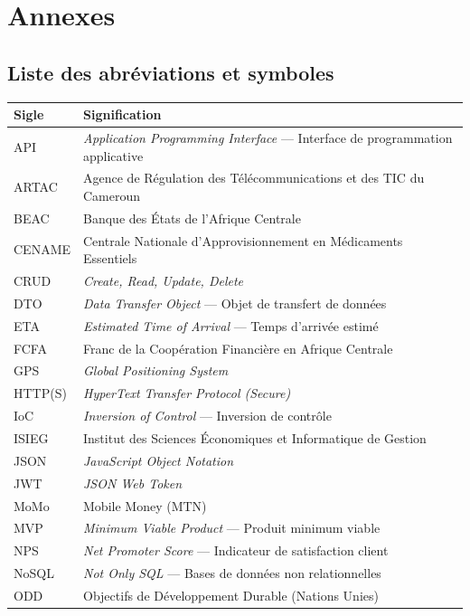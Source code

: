 \documentclass[12pt,a4paper,oneside]{report}
\begin{document}
\chapter*{Annexes}

\section*{Liste des abréviations et symboles}

\begin{longtable}{lp{12cm}}
  \toprule
  \textbf{Sigle} & \textbf{Signification} \\
  \midrule
  API & \textit{Application Programming Interface} — Interface de programmation applicative \\
  ARTAC & Agence de Régulation des Télécommunications et des TIC du Cameroun \\
  BEAC & Banque des États de l'Afrique Centrale \\
  CENAME & Centrale Nationale d'Approvisionnement en Médicaments Essentiels \\
  CRUD & \textit{Create, Read, Update, Delete} \\
  DTO & \textit{Data Transfer Object} — Objet de transfert de données \\
  ETA & \textit{Estimated Time of Arrival} — Temps d'arrivée estimé \\
  FCFA & Franc de la Coopération Financière en Afrique Centrale \\
  GPS & \textit{Global Positioning System} \\
  HTTP(S) & \textit{HyperText Transfer Protocol (Secure)} \\
  IoC & \textit{Inversion of Control} — Inversion de contrôle \\
  ISIEG & Institut des Sciences Économiques et Informatique de Gestion \\
  JSON & \textit{JavaScript Object Notation} \\
  JWT & \textit{JSON Web Token} \\
  MoMo & Mobile Money (MTN) \\
  MVP & \textit{Minimum Viable Product} — Produit minimum viable \\
  NPS & \textit{Net Promoter Score} — Indicateur de satisfaction client \\
  NoSQL & \textit{Not Only SQL} — Bases de données non relationnelles \\
  ODD & Objectifs de Développement Durable (Nations Unies) \\

\end{longtable}
\end{document}
